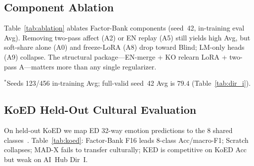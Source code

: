 \documentclass[journal]{IEEEtran}
\begin{document}
\subsection{Component Ablation}
Table~\ref{tab:ablation} ablates Factor-Bank components (seed~42, in-training eval Avg).
Removing two-pass affect (A2) or EN replay (A5) still yields high Avg, but soft-share alone (A0) and freeze-LoRA (A8) drop toward Blind; LM-only heads (A9) collapse.
The structural package---EN-merge + KO relearn LoRA + two-pass A---matters more than any single regularizer.

\begin{table}[!t]
\caption{Component ablation of SELENE Bank (seed~42; in-training Dir~I Avg).}
\label{tab:ablation}
\centering
{}
\end{table}
{\footnotesize $^{\ast}$Seeds 123/456 in-training Avg; full-valid seed~42 Avg is $79.4$ (Table~\ref{tab:dir_i}).}

\subsection{KoED Held-Out Cultural Evaluation}
On held-out KoED we map ED 32-way emotion predictions to the 8 shared classes~\cite{lee2025koed}.
Table~\ref{tab:koed}: Factor-Bank F16 leads 8-class Acc/macro-F1; Scratch collapses; MAD-X fails to transfer culturally; KED is competitive on KoED Acc but weak on AI~Hub Dir~I.
\end{document}

